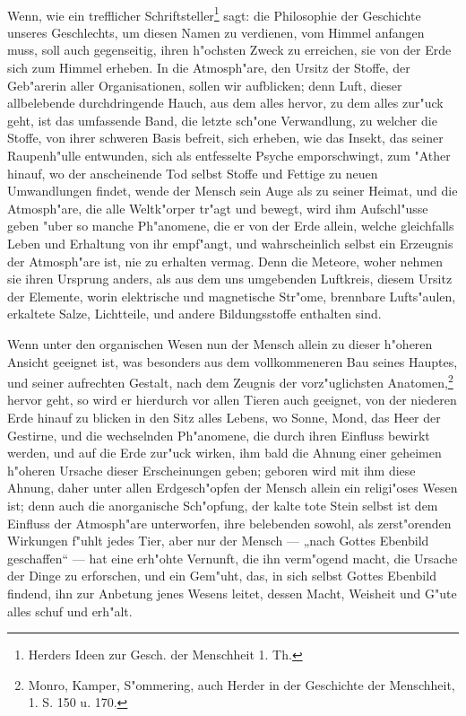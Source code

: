 \documentclass[a4paper, 11pt, oneside, polutonikogreek, german]{article}
\begin{document}
\paragraph{}
Wenn, wie ein trefflicher Schriftsteller\footnote{Herders Ideen zur Gesch. der Menschheit 1. Th.} sagt: die Philosophie der Geschichte unseres Geschlechts, um diesen Namen zu verdienen, vom Himmel anfangen muss, soll auch gegenseitig, ihren h"ochsten Zweck zu erreichen, sie von der Erde sich zum Himmel erheben. In die Atmosph"are, den Ursitz der Stoffe, der Geb"arerin aller Organisationen, sollen wir aufblicken; denn Luft, dieser allbelebende durchdringende Hauch, aus dem alles hervor, zu dem alles zur"uck geht, ist das umfassende Band, die letzte sch"one Verwandlung, zu welcher die Stoffe, von ihrer schweren Basis befreit, sich erheben, wie das Insekt, das seiner Raupenh"ulle entwunden, sich als entfesselte Psyche emporschwingt, zum "Ather hinauf, wo der anscheinende Tod selbst Stoffe und Fettige zu neuen Umwandlungen findet, wende der Mensch sein Auge als zu seiner Heimat, und die Atmosph"are, die alle Weltk"orper tr"agt und bewegt, wird ihm Aufschl"usse geben "uber so manche Ph"anomene, die er von der Erde allein, welche gleichfalls Leben und Erhaltung von ihr empf"angt, und wahrscheinlich selbst ein Erzeugnis der Atmosph"are ist, nie zu erhalten vermag. Denn die Meteore, woher nehmen sie ihren Ursprung anders, als aus dem uns umgebenden Luftkreis, diesem Ursitz der Elemente, worin elektrische und magnetische Str"ome, brennbare Lufts"aulen, erkaltete Salze, Lichtteile, und andere Bildungsstoffe enthalten sind.

Wenn unter den organischen Wesen nun der Mensch allein zu dieser h"oheren Ansicht geeignet ist, was besonders aus dem vollkommeneren Bau seines Hauptes, und seiner aufrechten Gestalt, nach dem Zeugnis der vorz"uglichsten Anatomen,\footnote{Monro, Kamper, S"ommering, auch Herder in der Geschichte der Menschheit, 1. S. 150 u. 170.} hervor geht, so wird er hierdurch vor allen Tieren auch geeignet, von der niederen Erde hinauf zu blicken in den Sitz alles Lebens, wo Sonne, Mond, das Heer der Gestirne, und die wechselnden Ph"anomene, die durch ihren Einfluss bewirkt werden, und auf die Erde zur"uck wirken, ihm bald die Ahnung einer geheimen h"oheren Ursache dieser Erscheinungen geben; geboren wird mit ihm diese Ahnung, daher unter allen Erdgesch"opfen der Mensch allein ein religi"oses Wesen ist; denn auch die anorganische Sch"opfung, der kalte tote Stein selbst ist dem Einfluss der Atmosph"are unterworfen, ihre belebenden sowohl, als zerst"orenden Wirkungen f"uhlt jedes Tier, aber nur der Mensch --- „nach Gottes Ebenbild geschaffen“ --- hat eine erh"ohte Vernunft, die ihn verm"ogend macht, die Ursache der Dinge zu erforschen, und ein Gem"uht, das, in sich selbst Gottes Ebenbild findend, ihn zur Anbetung jenes Wesens leitet, dessen Macht, Weisheit und G"ute alles schuf und erh"alt.
\end{document}
